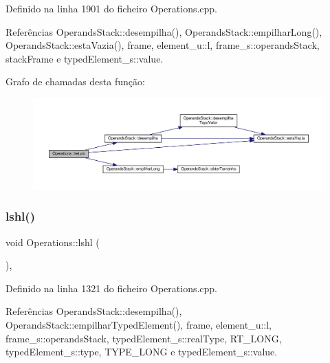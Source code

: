 Definido na linha 1901 do ficheiro Operations.\+cpp.



Referências Operands\+Stack\+::desempilha(), Operands\+Stack\+::empilhar\+Long(), Operands\+Stack\+::esta\+Vazia(), frame, element\+\_\+u\+::l, frame\+\_\+s\+::operands\+Stack, stack\+Frame e typed\+Element\+\_\+s\+::value.

Grafo de chamadas desta função\+:
\nopagebreak
\begin{figure}[H]
\begin{center}
\leavevmode
\includegraphics[width=350pt]{classOperations_adbc4db2dbfcae7185bc9b7a005e988ea_cgraph}
\end{center}
\end{figure}
\mbox{\label{classOperations_a9d2b2a5ea74f26e6a5005ec9e99b24d9}} 
\subsubsection{\texorpdfstring{lshl()}{lshl()}}
{\footnotesize\ttfamily void Operations\+::lshl (\begin{DoxyParamCaption}{ }\end{DoxyParamCaption})\hspace{0.3cm}{\ttfamily [static]}, {\ttfamily [private]}}



Definido na linha 1321 do ficheiro Operations.\+cpp.



Referências Operands\+Stack\+::desempilha(), Operands\+Stack\+::empilhar\+Typed\+Element(), frame, element\+\_\+u\+::l, frame\+\_\+s\+::operands\+Stack, typed\+Element\+\_\+s\+::real\+Type, R\+T\+\_\+\+L\+O\+NG, typed\+Element\+\_\+s\+::type, T\+Y\+P\+E\+\_\+\+L\+O\+NG e typed\+Element\+\_\+s\+::value.


